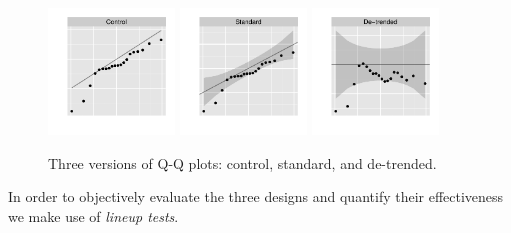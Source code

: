 \documentclass{article}\usepackage[]{graphicx}\usepackage[]{color}
\begin{document}
\begin{figure}
\centering
\includegraphics[width=0.3\textwidth]{qqplots1}
\includegraphics[width=0.3\textwidth]{qqplots2}
\includegraphics[width=0.3\textwidth]{qqplots3}
\caption{ \label{qqplots} Three versions of Q-Q plots: control, standard, and de-trended.}
\end{figure}



In order to objectively evaluate  the three designs and quantify their effectiveness we make use of {\it lineup tests}.
\end{document}
